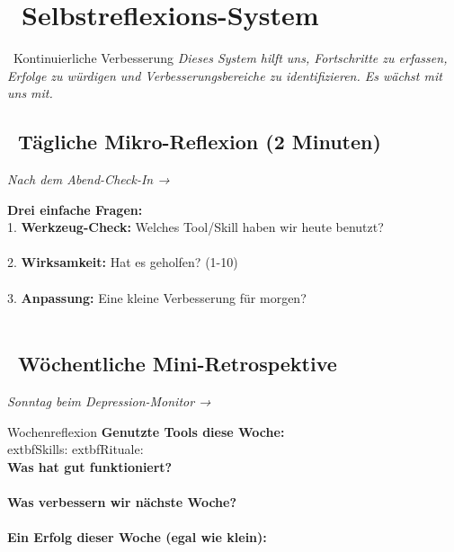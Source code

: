 \newpage
\section*{\textcolor{ctmmPurple}{\faChartLine~Selbstreflexions-System}}
\label{sec:feedback}

\begin{ctmmPurpleBox}{\faSync~Kontinuierliche Verbesserung}
\textit{Dieses System hilft uns, Fortschritte zu erfassen, Erfolge zu würdigen und Verbesserungsbereiche zu identifizieren. Es wächst mit uns mit.}
\end{ctmmPurpleBox}

\subsection*{\faCalendar~Tägliche Mikro-Reflexion (2 Minuten)}
\textit{Nach dem Abend-Check-In → }

\textbf{Drei einfache Fragen:}\\[0.3cm]
1. \textbf{Werkzeug-Check:} Welches Tool/Skill haben wir heute benutzt?\\
\\[0.3cm]

2. \textbf{Wirksamkeit:} Hat es geholfen? (1-10)\\
\\[0.3cm]

3. \textbf{Anpassung:} Eine kleine Verbesserung für morgen?\\
\\[0.5cm]

\subsection*{\faCalendar~Wöchentliche Mini-Retrospektive}
\textit{Sonntag beim Depression-Monitor → }

\begin{ctmmYellowBox}{Wochenreflexion}
\textbf{Genutzte Tools diese Woche:}\\
 \quad 	extbf{Skills:}  \quad 	extbf{Rituale:} \\[0.3cm]

\textbf{Was hat gut funktioniert?}\\
\\[0.3cm]

\textbf{Was verbessern wir nächste Woche?}\\
\\[0.3cm]

\textbf{Ein Erfolg dieser Woche (egal wie klein):}\\
\end{ctmmYellowBox}

